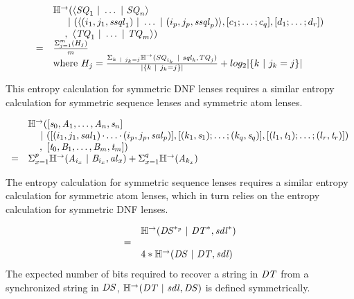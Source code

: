 \documentclass[acmsmall,screen,anonymous]{acmart}
\begin{document}
\[
  \begin{array}{rl}
    & \mathbb{H}^\rightarrow(\langle\mathit{SQ}_1 ~|~ \ldots ~|~ \mathit{SQ}_n\rangle\\
    & \hspace*{1.21em}~|~
      (\langle(i_1,j_1,\mathit{ssql}_1)~|~
      \ldots~|~
      (i_p,j_p,\mathit{ssql}_p)\rangle
      ,[ c_1;\ldots;c_q ]
      ,[ d_1;\ldots;d_r ])\\
    & \hspace*{1.21em},~\langle\mathit{TQ}_1 ~|~ \ldots ~|~ \mathit{TQ}_m\rangle)\\
    = & \frac{\Sigma_{j=1}^m(H_j)}{m}\\
    & \text{where } H_j = \frac{\Sigma_{k~|~ j_k = j}
      \mathbb{H}^\rightarrow(\mathit{SQ}_{i_k}~|~\mathit{sql}_k,\mathit{TQ}_j)}{|\{k~|~
      j_k = j\}|} + log_2|\{k~|~ j_k = j\}|
  \end{array}
\]

This entropy calculation for symmetric DNF lenses requires a similar entropy
calculation for symmetric sequence lenses and symmetric atom lenses.

\[
  \begin{array}{rl}
      & \mathbb{H}^\rightarrow(
        [\mathit{s}_0,\mathit{A}_1,\ldots,\mathit{A}_n,\mathit{s}_n]\\
      & \hspace*{1em}~|~
        ([(i_1,j_1,\mathit{sal}_1)\mkern-1mu\cdot\mkern-1mu
        \ldots\mkern-1mu\cdot\mkern-1mu
        (i_p,j_p,\mathit{sal}_p)]
        ,[ (k_1,\mathit{s}_1);\ldots;(k_q,\mathit{s}_q) ]
        ,[ (l_1,\mathit{t}_1);\ldots;(l_r,\mathit{t}_r) ])\\
      & \hspace*{1.21em},~
        [\mathit{t}_0,\mathit{B}_1,\ldots,\mathit{B}_m,\mathit{t}_m])\\
      =
      & \Sigma_{x=1}^p\mathbb{H}^\rightarrow(\mathit{A}_{i_x} ~|~ \mathit{B}_{i_x},\mathit{al}_x) +
        \Sigma_{x=1}^q\mathbb{H}^\rightarrow(\mathit{A}_{k_x})
  \end{array}
\]

The entropy calculation for symmetric sequence lenses requires a similar entropy
calculation for symmetric atom lenses, which in turn relies on the entropy
calculation for symmetric DNF lenses.

\[\begin{array}{rl}
      & \mathbb{H}^\rightarrow(\mathit{DS}^{*_{p}} ~|~ {\mathit{DT}}^*,{\mathit{sdl}}^*)\\
      =\\
      & 4*\mathbb{H}^\rightarrow(\mathit{DS}~|~\mathit{DT},\mathit{sdl})
  \end{array}
\]
The expected number of bits required to recover a string in $\mathit{DT}$ from
a synchronized string in $\mathit{DS}$, $\mathbb{H}^\rightarrow(\mathit{DT} ~|~
  \mathit{sdl}, \mathit{DS})$ is defined symmetrically.
\end{document}
